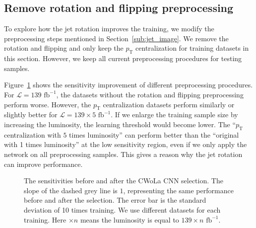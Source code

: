 \documentclass[12pt]{article}
\begin{document}
    \subsection{Remove rotation and flipping preprocessing}%
    \label{sub:remove_rotation_and_flipping_preprocessing}
        To explore how the jet rotation improves the training, we modify the preprocessing steps mentioned in Section~\ref{sub:jet_image}. We remove the rotation and flipping and only keep the $p_\text{T}$ centralization for training datasets in this section. However, we keep all current preprocessing procedures for testing samples. 
        
        Figure~\ref{fig:sensitivity_improvement_origin_pt_center_x1_x5} shows the sensitivity improvement of different preprocessing procedures. For $\mathcal{L} = \text{139 fb}^{-1}$, the datasets without the rotation and flipping preprocessing perform worse. However, the $p_{\text{T}}$ centralization datasets perform similarly or slightly better for $\mathcal{L} =  139 \times 5 \text{ fb}^{-1}$. If we enlarge the training sample size by increasing the luminosity, the learning threshold would become lower. The ``$p_{\text{T}}$ centralization with $5$ times luminosity'' can perform better than the ``original with 1 times luminosity'' at the low sensitivity region, even if we only apply the network on all preprocessing samples. This gives a reason why the jet rotation can improve performance.
        \begin{figure}[htpb] 
            \centering
            \caption{The sensitivities before and after the CWoLa CNN selection. The slope of the dashed grey line is $1$, representing the same performance before and after the selection. The error bar is the standard deviation of 10 times training. We use different datasets for each training. Here $\times n$ means the luminosity is equal to $139 \times n \text{ fb}^{-1}$.}
            \label{fig:sensitivity_improvement_origin_pt_center_x1_x5}
        \end{figure}



        
\end{document}
